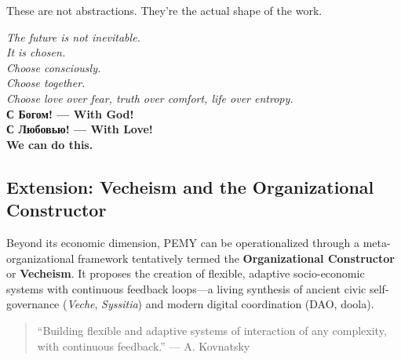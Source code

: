 \documentclass[11pt,a4paper]{article}
\theoremstyle{definition}
\theoremstyle{remark}
\begin{document}
These are not abstractions. They're the actual shape of the work.

\vspace{1cm}

\begin{center}
\textit{The future is not inevitable.}\\
\textit{It is chosen.}\\
\textit{Choose consciously.}\\
\textit{Choose together.}\\
\textit{Choose love over fear, truth over comfort, life over entropy.}\\[0.5cm]

\textbf{С Богом! --- With God!}\\
\textbf{С Любовью! --- With Love!}\\
\textbf{We can do this.}
\end{center}

\appendix

\subsection*{Extension: Vecheism and the Organizational Constructor}

Beyond its economic dimension, PEMY can be operationalized through a meta-organizational framework tentatively termed the \textbf{Organizational Constructor} or \textbf{Vecheism}.  
It proposes the creation of flexible, adaptive socio-economic systems with continuous feedback loops---a living synthesis of ancient civic self-governance (\textit{Veche}, \textit{Syssitia}) and modern digital coordination (DAO, doola).

\begin{quote}
``Building flexible and adaptive systems of interaction of any complexity, with continuous feedback.'' — A. Kovnatsky
\end{quote}
\end{document}
